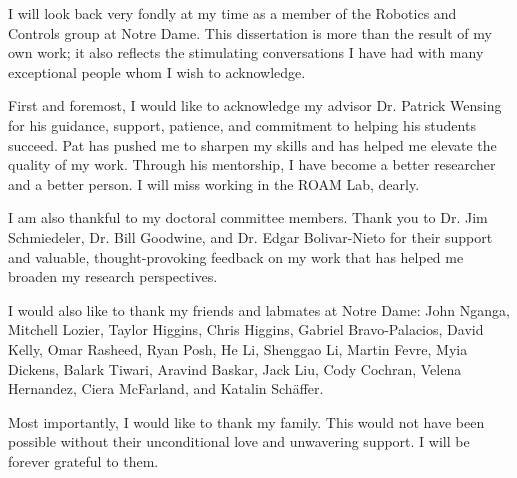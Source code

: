 \begin{acknowledge}
	I will look back very fondly at my time as a member of the Robotics and Controls group at Notre Dame. This dissertation is more than the result of my own work; it also reflects the stimulating conversations I have had with many exceptional people whom I wish to acknowledge.
	
	First and foremost, I would like to acknowledge my advisor Dr. Patrick Wensing for his guidance, support, patience, and commitment to helping his students succeed. Pat has pushed me to sharpen my skills and has helped me elevate the quality of my work. Through his mentorship, I have become a better researcher and a better person. I will miss working in the ROAM Lab, dearly.
	
	I am also thankful to my doctoral committee members. Thank you to Dr. Jim Schmiedeler, Dr. Bill Goodwine, and Dr. Edgar Bolivar-Nieto for their support and valuable, thought-provoking feedback on my work that has helped me broaden my research perspectives. 
	
	I would also like to thank my friends and labmates at Notre Dame: John Nganga, Mitchell Lozier, Taylor Higgins, Chris Higgins, Gabriel Bravo-Palacios, David Kelly, Omar Rasheed, Ryan Posh, He Li, Shenggao Li, Martin Fevre, Myia Dickens, Balark Tiwari, Aravind Baskar, Jack Liu, Cody Cochran, Velena Hernandez, Ciera McFarland, and Katalin Sch{\"a}ffer. 
	
	Most importantly, I would like to thank my family. This would not have been possible without their unconditional love and unwavering support. I will be forever grateful to them.
\end{acknowledge}